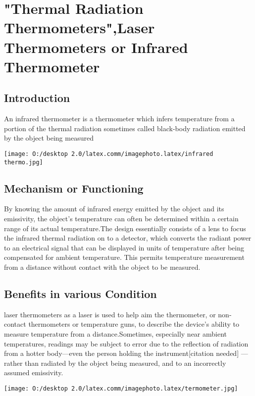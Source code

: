 \documentclass[12pt]{article}
\begin{document}
\section{"Thermal Radiation Thermometers",Laser Thermometers or Infrared Thermometer }
\subsection{Introduction}

An infrared thermometer is a thermometer which infers temperature from a portion of the thermal radiation sometimes called black-body radiation emitted by the object being measured

\texttt{[image: O:/desktop 2.0/latex.comm/imagephoto.latex/infrared thermo.jpg]} 


\subsection{Mechanism or Functioning}

By knowing the amount of infrared energy emitted by the object and its emissivity, the object's temperature can often be determined within a certain range of its actual temperature.The design essentially consists of a lens to focus the infrared thermal radiation on to a detector, which converts the radiant power to an electrical signal that can be displayed in units of temperature after being compensated for ambient temperature. This permits temperature measurement from a distance without contact with the object to be measured.






\subsection{Benefits in various Condition}

 laser thermometers as a laser is used to help aim the thermometer, or non-contact thermometers or temperature guns, to describe the device's ability to measure temperature from a distance.Sometimes, especially near ambient temperatures, readings may be subject to error due to the reflection of radiation from a hotter body—even the person holding the instrument[citation needed] — rather than radiated by the object being measured, and to an incorrectly assumed emissivity.
 
 \texttt{[image: O:/desktop 2.0/latex.comm/imagephoto.latex/termometer.jpg]} 
 
\end{document}
